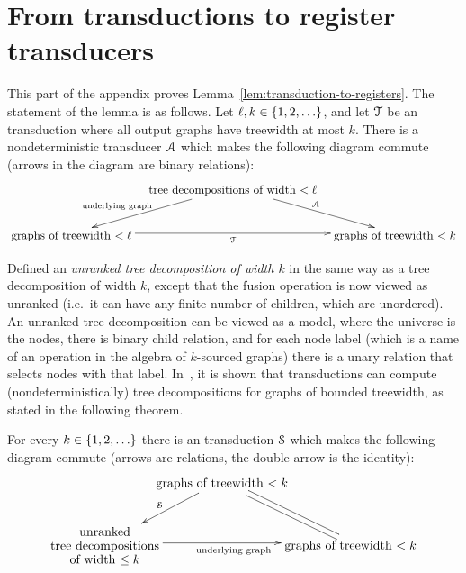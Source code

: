\section{From transductions to register transducers}
\label{sec:transductions-to-transducers}
This part of the appendix proves Lemma~\ref{lem:transduction-to-registers}. The statement of the lemma is as follows. 
    Let $\ell, k \in \{1,2,\ldots\}$, and  let ${\mathcal T}$ be an \mso transduction where all output graphs have treewidth at most $k$. There is a nondeterministic  transducer ${\mathcal A}$ which makes the following diagram commute (arrows in the diagram are binary relations):
    \begin{align*}
    \xymatrix@C=0.3cm{
         & \txt{tree decompositions of width $< \ell$}
        \ar[dl]_-{\txt{\scriptsize underlying graph \qquad \qquad}}
         \ar[dr]^\Aa\\
        \txt{graphs of treewidth $< \ell$}\ar[rr]_\Tt & &
        \txt{graphs  of treewidth $< k$} 
    }
    \end{align*}


Defined an \emph{unranked tree decomposition of width $k$} in the same way as a tree decomposition of width $k$, except that the fusion operation is now viewed as unranked (i.e.~it can have any finite number of children, which are unordered). An unranked tree decomposition can be viewed as a model, where the universe is the nodes, there is binary child relation, and for each  node label (which is a name of an operation in the algebra of $k$-sourced graphs) there is a unary relation that selects nodes with that label.  In~\cite[Corollary 3]{bojanczykOptimizingTreeDecompositions2017a}, it is shown that \mso transductions can compute (nondeterministically) tree decompositions for graphs of bounded treewidth, as stated in the following theorem.
 
\begin{theorem}\label{thm:boj-pil}
    For every $k \in \{1,2,\ldots\}$ there is an \mso transduction ${\mathcal S}$ which makes the following diagram commute (arrows are relations, the double arrow is the identity):
    \begin{align*}
        \xymatrix@C=-0.3cm{ 
              & \txt{graphs of treewidth $<k$}
             \ar[dl]_{\Ss}
             \ar@{-}@<-.5ex>[dr] \ar@{-}@<.5ex>[dr]
             \\
            \txt{unranked\\ tree decompositions\\
            of width $\le k$} 
            \ar[rr]_-{\text{ \qquad underlying graph}}
             & & \txt{graphs of treewidth $<k$}
        }
    \end{align*}
\end{theorem}



